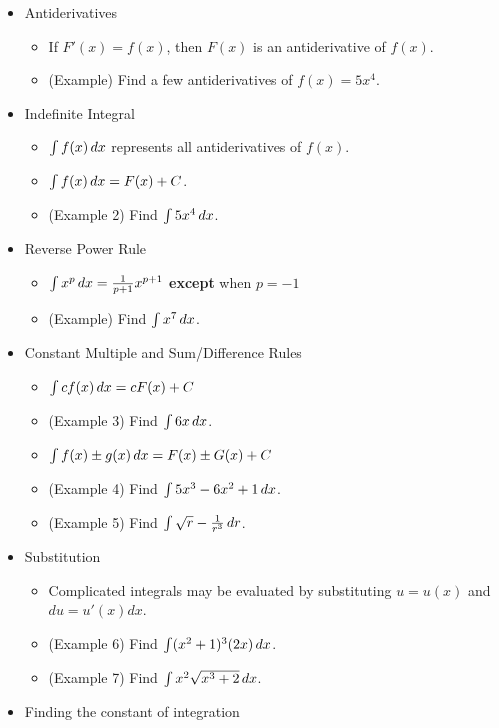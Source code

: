 \documentclass[11pt]{article}
\begin{document}
\begin{itemize}
\item Antiderivatives
  \begin{itemize}
    \item If \(F'(x)=f(x)\), then \(F(x)\) is an antiderivative of \(f(x)\).
    \item (Example) Find a few antiderivatives of \(f(x)=5x^4\).
  \end{itemize}
\item Indefinite Integral
  \begin{itemize}
    \item \(\int f(x)\,d x\) represents all antiderivatives of \(f(x)\).
    \item \(\int f(x)\,d x=F(x)+C\).
    \item (Example 2) Find \(\int 5x^4 \,d x\).
  \end{itemize}
\item Reverse Power Rule
  \begin{itemize}
    \item \(\int x^p\,d x = \frac{1}{p+1}x^{p+1}\) \textbf{except} when \(p=-1\)
    \item (Example) Find \(\int x^7\,d x\).
  \end{itemize}
\item Constant Multiple and Sum/Difference Rules
  \begin{itemize}
    \item \(\int cf(x)\,d x=cF(x)+C\)
    \item (Example 3) Find \(\int 6x\,d x\).
    \item \(\int f(x)\pm g(x)\,d x=F(x)\pm G(x)+C\)
    \item (Example 4) Find \(\int 5x^3-6x^2+1\,d x\).
    \item (Example 5) Find \(\int \sqrt r - \frac{1}{r^3}\,d r\).
  \end{itemize}
\item Substitution
  \begin{itemize}
    \item Complicated integrals may be evaluated by substituting \(u=u(x)\)
          and \(du=u'(x)dx\).
    \item (Example 6) Find \(\int(x^2+1)^3(2x)\,d x\).
    \item (Example 7) Find \(\int x^2\sqrt{x^3+2}\,d x\).
  \end{itemize}
\item Finding the constant of integration
  \begin{itemize}

\end{itemize}
\end{itemize}
\end{document}
